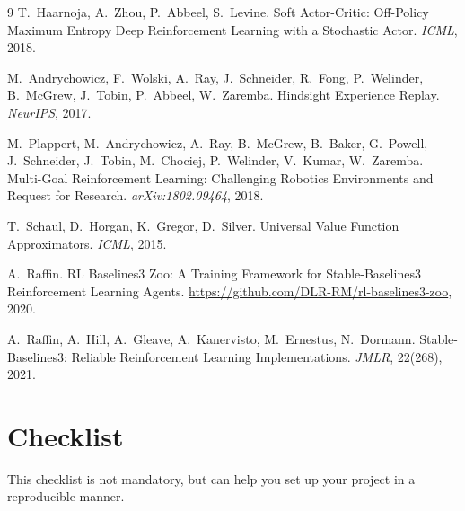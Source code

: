 \documentclass{article}
\begin{document}
\begin{thebibliography}{9}
T.~Haarnoja, A.~Zhou, P.~Abbeel, S.~Levine.
\newblock Soft Actor-Critic: Off-Policy Maximum Entropy Deep Reinforcement
Learning with a Stochastic Actor.
\newblock \emph{ICML}, 2018.

M.~Andrychowicz, F.~Wolski, A.~Ray, J.~Schneider, R.~Fong, P.~Welinder,
B.~McGrew, J.~Tobin, P.~Abbeel, W.~Zaremba.
\newblock Hindsight Experience Replay.
\newblock \emph{NeurIPS}, 2017.

M.~Plappert, M.~Andrychowicz, A.~Ray, B.~McGrew, B.~Baker, G.~Powell,
J.~Schneider, J.~Tobin, M.~Chociej, P.~Welinder, V.~Kumar, W.~Zaremba.
\newblock Multi-Goal Reinforcement Learning: Challenging Robotics Environments
and Request for Research.
\newblock \emph{arXiv:1802.09464}, 2018.

T.~Schaul, D.~Horgan, K.~Gregor, D.~Silver.
\newblock Universal Value Function Approximators.
\newblock \emph{ICML}, 2015.

A.~Raffin.
\newblock RL Baselines3 Zoo: A Training Framework for Stable-Baselines3
Reinforcement Learning Agents.
\newblock \url{https://github.com/DLR-RM/rl-baselines3-zoo}, 2020.

A.~Raffin, A.~Hill, A.~Gleave, A.~Kanervisto, M.~Ernestus, N.~Dormann.
\newblock Stable-Baselines3: Reliable Reinforcement Learning Implementations.
\newblock \emph{JMLR}, 22(268), 2021.
\end{thebibliography}

\newpage
\section*{Checklist}
This checklist is not mandatory, but can help you set up your project in a
reproducible manner.
\end{document}
